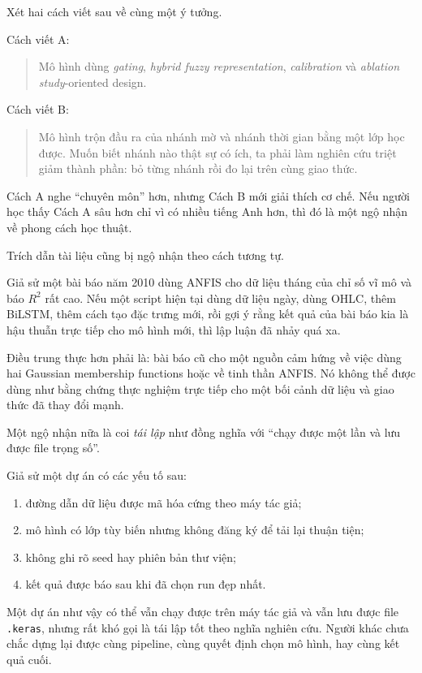 \begin{example}
Xét hai cách viết sau về cùng một ý tưởng.

Cách viết A:
\begin{quote}
Mô hình dùng \emph{gating}, \emph{hybrid fuzzy representation}, \emph{calibration} và \emph{ablation study}-oriented design.
\end{quote}

Cách viết B:
\begin{quote}
Mô hình trộn đầu ra của nhánh mờ và nhánh thời gian bằng một lớp học được. Muốn biết nhánh nào thật sự có ích, ta phải làm nghiên cứu triệt giảm thành phần: bỏ từng nhánh rồi đo lại trên cùng giao thức.
\end{quote}

Cách A nghe ``chuyên môn'' hơn, nhưng Cách B mới giải thích cơ chế. Nếu người học thấy Cách A sâu hơn chỉ vì có nhiều tiếng Anh hơn, thì đó là một ngộ nhận về phong cách học thuật.
\end{example}

Trích dẫn tài liệu cũng bị ngộ nhận theo cách tương tự.

\begin{example}
Giả sử một bài báo năm 2010 dùng ANFIS cho dữ liệu tháng của chỉ số vĩ mô và báo \(R^2\) rất cao. Nếu một script hiện tại dùng dữ liệu ngày, dùng OHLC, thêm BiLSTM, thêm cách tạo đặc trưng mới, rồi gợi ý rằng kết quả của bài báo kia là hậu thuẫn trực tiếp cho mô hình mới, thì lập luận đã nhảy quá xa.

Điều trung thực hơn phải là: bài báo cũ cho một nguồn cảm hứng về việc dùng hai Gaussian membership functions hoặc về tinh thần ANFIS. Nó không thể được dùng như bằng chứng thực nghiệm trực tiếp cho một bối cảnh dữ liệu và giao thức đã thay đổi mạnh.
\end{example}

Một ngộ nhận nữa là coi \emph{tái lập} như đồng nghĩa với ``chạy được một lần và lưu được file trọng số''.

\begin{example}
Giả sử một dự án có các yếu tố sau:
\begin{enumerate}
\item đường dẫn dữ liệu được mã hóa cứng theo máy tác giả;
\item mô hình có lớp tùy biến nhưng không đăng ký để tải lại thuận tiện;
\item không ghi rõ seed hay phiên bản thư viện;
\item kết quả được báo sau khi đã chọn run đẹp nhất.
\end{enumerate}
Một dự án như vậy có thể vẫn chạy được trên máy tác giả và vẫn lưu được file \texttt{.keras}, nhưng rất khó gọi là tái lập tốt theo nghĩa nghiên cứu. Người khác chưa chắc dựng lại được cùng pipeline, cùng quyết định chọn mô hình, hay cùng kết quả cuối.
\end{example}

